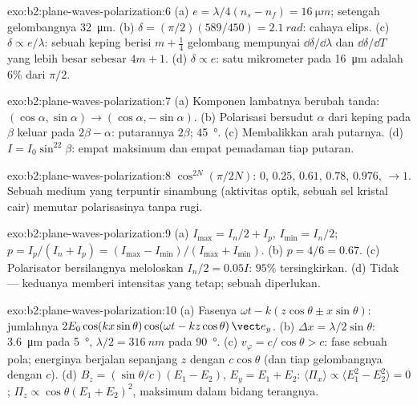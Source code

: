 \begin{solution}{exo:b2:plane-waves-polarization:6}
(a) $e = \lambda/4(n_s - n_f) = \qty{16}{\micro m}$; setengah gelombangnya \qty{32}{\micro m}. (b) $\delta =
(\pi/2)(589/450) = \qty{2.1}{rad}$: cahaya elips. (c) $\delta \propto e/\lambda$: sebuah
keping berisi $m + \tfrac14$ gelombang mempunyai $\dd\delta/\dd\lambda$ dan $\dd\delta/\dd T$ yang lebih besar sebesar
$4m + 1$. (d) $\delta \propto e$: satu mikrometer pada \qty{16}{\micro m} adalah $6\%$ dari $\pi/2$.
\end{solution}

\begin{solution}{exo:b2:plane-waves-polarization:7}
(a) Komponen lambatnya berubah tanda: $(\cos\alpha, \sin\alpha) \to (\cos\alpha,
-\sin\alpha)$. (b) Polarisasi bersudut $\alpha$ dari keping pada $\beta$ keluar
pada $2\beta - \alpha$: putarannya $2\beta$; \qty{45}{\degree}. (c) Membalikkan arah
putarnya. (d) $I = I_0\sin^22\beta$: empat maksimum dan empat pemadaman
tiap putaran.
\end{solution}

\begin{solution}{exo:b2:plane-waves-polarization:8}
$\cos^{2N}(\pi/2N)$: $0$, $0.25$, $0.61$, $0.78$, $0.976$, $\to 1$. Sebuah
medium yang terpuntir sinambung (aktivitas optik, sebuah sel kristal cair)
memutar polarisasinya tanpa rugi.
\end{solution}

\begin{solution}{exo:b2:plane-waves-polarization:9}
(a) $I_{\max} = I_n/2 + I_p$, $I_{\min} = I_n/2$; $p = I_p/(I_n + I_p) = (I_{\max} -
I_{\min})/(I_{\max} + I_{\min})$. (b) $p = 4/6 = 0.67$. (c) Polarisator bersilangnya
meloloskan $I_n/2 = 0.05I$: $95\%$ tersingkirkan. (d) Tidak --- keduanya memberi
intensitas yang tetap; sebuah  diperlukan.
\end{solution}

\begin{solution}{exo:b2:plane-waves-polarization:10}
(a) Fasenya $\omega t - k(z\cos\theta \pm x\sin\theta)$: jumlahnya $2E_0\cos(kx\sin\theta)\cos(\omega t
- kz\cos\theta)\,\vect e_y$. (b) $\Delta x = \lambda/2\sin\theta$: \qty{3.6}{\micro m} pada \qty{5}{\degree},
$\lambda/2 = \qty{316}{nm}$ pada \qty{90}{\degree}. (c) $v_\varphi = c/\cos\theta > c$: fase sebuah
pola; energinya berjalan sepanjang $z$ dengan $c\cos\theta$ (dan tiap gelombangnya dengan $c$).
(d) $B_z = (\sin\theta/c)(E_1 - E_2)$, $E_y = E_1 + E_2$: $\langle\Pi_x\rangle \propto
\langle E_1^2 - E_2^2\rangle = 0$; $\Pi_z \propto \cos\theta(E_1 + E_2)^2$, maksimum dalam
bidang terangnya.
\end{solution}

